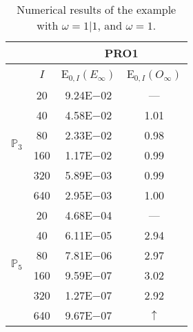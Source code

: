 \begin{table}[H]
\caption{Numerical results of the example with $\omega=1|1$, and $\omega=1$.}
\setlength{\tabcolsep}{5pt}
\centering
\begin{tabular}{@{}l c c c@{}}
\toprule
 &  & \multicolumn{2}{c}{PRO1}\\
\midrule
 & $I$ & E$_{0,I}(E_{\infty})$ & E$_{0,I}(O_{\infty})$\\
\midrule
\multirow{6}{*}{$\mathbb{P}_{3}$}
 & 20 & 9.24E$-$02 & ---\\
 & 40 & 4.58E$-$02 & 1.01\\
 & 80 & 2.33E$-$02 & 0.98\\
 & 160 & 1.17E$-$02 & 0.99\\
 & 320 & 5.89E$-$03 & 0.99\\
 & 640 & 2.95E$-$03 & 1.00\\
\midrule
\multirow{6}{*}{$\mathbb{P}_{5}$}
 & 20 & 4.68E$-$04 & ---\\
 & 40 & 6.11E$-$05 & 2.94\\
 & 80 & 7.81E$-$06 & 2.97\\
 & 160 & 9.59E$-$07 & 3.02\\
 & 320 & 1.27E$-$07 & 2.92\\
 & 640 & 9.67E$-$07 & $\uparrow$\\
\bottomrule
\end{tabular}
\label{Table:PRO:test_01_01_test44_pro1}
\end{table}
